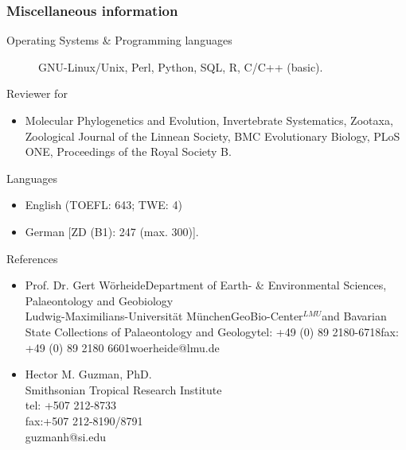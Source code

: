 \documentclass[letter,10pt]{article}
\begin{document}
\subsubsection*{Miscellaneous information}
\begin{small}
	\begin{description}
		\item[Operating Systems \& Programming languages] GNU-Linux/Unix, Perl, Python, SQL, R, C/C++ (basic).
		\item[Reviewer for]
	\end{description}

	\begin{itemize}
		\item Molecular Phylogenetics and Evolution, Invertebrate Systematics, Zootaxa, Zoological Journal of the Linnean Society, BMC Evolutionary Biology, PLoS ONE, Proceedings of the Royal Society B.
	\end{itemize}

	\begin{description}
		\item[Languages]
	\end{description}

	\begin{itemize}
		\item English (TOEFL: 643; TWE: 4)
		\item German [ZD (B1): 247 (max. 300)].
	\end{itemize}

	\begin{description}
		\item[References]
	\end{description}
	\begin{itemize}
		\item{Prof. Dr. Gert W\"orheide\newline Department of Earth- \& Environmental Sciences, Palaeontology and Geobiology\\ Ludwig-Maximilians-Universit\"at M\"unchen\newline GeoBio-Center$^{LMU}$\newline and Bavarian State Collections of Palaeontology and Geology\newline tel: +49 (0) 89 2180-6718\newline fax: +49 (0) 89 2180 6601\newline woerheide@lmu.de}
		
		\item{Hector M. Guzman, PhD.\\Smithsonian Tropical Research Institute\\tel: +507 212-8733\\fax:+507 212-8190/8791\\guzmanh@si.edu}


\end{itemize}
\end{small}
\end{document}

